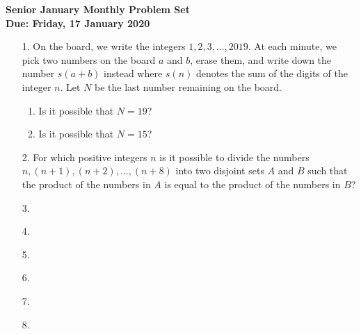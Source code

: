 \documentclass{article}
\begin{document}
\begin{center}
\textbf{\Large Senior January Monthly Problem Set}
\\ \vspace{1em}
\textbf{\large Due: Friday, 17 January 2020}
\end{center}

\begin{enumerate}

\vspace{6pt}
\item[1.] %
On the board, we write the integers $1, 2, 3, \dots, 2019$. At each minute, we pick two numbers on the board $a$ and $b$, erase them, and write down the number $s(a + b)$ instead where $s(n)$ denotes the sum of the digits of the integer $n$. Let $N$ be the last number remaining on the board.
\begin{enumerate}
	\item Is it possible that $N = 19$?
	\item Is it possible that $N = 15$?
\end{enumerate}

\vspace{6pt}
\item[2.] %
For which positive integers $n$ is it possible to divide the numbers $n, (n + 1), (n + 2), \dots, (n + 8)$ into two disjoint sets $A$ and $B$ such that the product of the numbers in $A$ is equal to the product of the numbers in $B$?

\vspace{6pt}
\item[3.]

\vspace{6pt}
\item[4.]

\vspace{6pt}
\item[5.]

\vspace{6pt}
\item[6.]

\vspace{6pt}
\item[7.]

\vspace{6pt}
\item[8.]

\end{enumerate}
\end{document}
